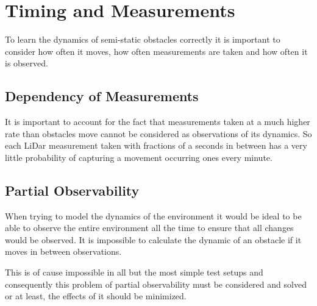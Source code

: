 \section{Timing and Measurements}
\label{sec:time_and_measurements}
To learn the dynamics of semi-static obstacles correctly it is important to consider how often it moves, how often measurements are taken and how often it is observed.

\subsection{Dependency of Measurements}
It is important to account for the fact that measurements taken at a much higher rate than obstacles move cannot be considered as observations of its dynamics. 
So each LiDar measurement taken with fractions of a seconds in between has a very little probability of capturing a movement occurring ones every minute. 
\subsection{Partial Observability}
When trying to model the dynamics of the environment it would be ideal to be able to observe the entire environment all the time to ensure that all changes would be observed.
It is impossible to calculate the dynamic of an obstacle if it moves in between observations.

This is of cause impossible in all but the most simple test setups and consequently this problem of partial observability must be considered and solved or at least, the effects of it should be minimized.

